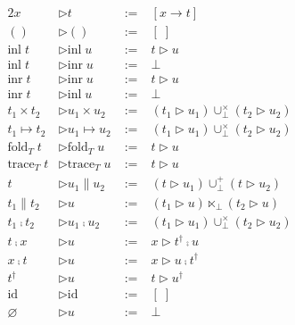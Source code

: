 \documentclass{jsarticle}
\begin{document}
\begin{figure}[H]
  \begin{minipage}[b]{0.48\hsize}
    \begin{alignat*}{2}
      x                 &\triangleright t                 \;&:=\; &[x \rightarrow t] \\
      ()                &\triangleright ()                \;&:=\; &[\;] \\
      \text{inl}\;t     &\triangleright \text{inl}\;u     \;&:=\; &t \triangleright u \\
      \text{inl}\;t     &\triangleright \text{inr}\;u     \;&:=\; &\bot \\
      \text{inr}\;t     &\triangleright \text{inr}\;u     \;&:=\; &t \triangleright u \\
      \text{inr}\;t     &\triangleright \text{inl}\;u     \;&:=\; &\bot \\
      t_1\times{}t_2    &\triangleright u_1\times{}u_2    \;&:=\; &(t_1 \triangleright u_1)\cup^\times_\bot(t_2 \triangleright u_2) \\
      t_1\mapsto{}t_2   &\triangleright u_1\mapsto{}u_2   \;&:=\; &(t_1 \triangleright u_1)\cup^\times_\bot(t_2 \triangleright u_2) \\
      \text{fold}_T\;t  &\triangleright \text{fold}_T\;u  \;&:=\; &t \triangleright u \\
      \text{trace}_T\;t &\triangleright \text{trace}_T\;u \;&:=\; &t \triangleright u \\
      t                 &\triangleright u_1\parallel{}u_2 \;&:=\; &(t \triangleright u_1)\cup^+_\bot(t \triangleright u_2) \\
      t_1\parallel{}t_2 &\triangleright u                 \;&:=\; &(t_1 \triangleright u)\ltimes_\bot(t_2 \triangleright u) \\
      t_1\fcmp{}t_2     &\triangleright u_1\fcmp{}u_2     \;&:=\; &(t_1 \triangleright u_1)\cup^\times_\bot(t_2 \triangleright u_2) \\
      t\fcmp{}x         &\triangleright u                 \;&:=\; &x \triangleright t^\dagger\fcmp{}u \\
      x\fcmp{}t         &\triangleright u                 \;&:=\; &x \triangleright u\fcmp{}t^\dagger \\
      t^\dagger         &\triangleright u                 \;&:=\; &t \triangleright u^\dagger \\
      \text{id}         &\triangleright \text{id}         \;&:=\; &[\;] \\
      \varnothing       &\triangleright u                 \;&:=\; &\bot \\

\end{alignat*}
\end{minipage}
\end{figure}
\end{document}
